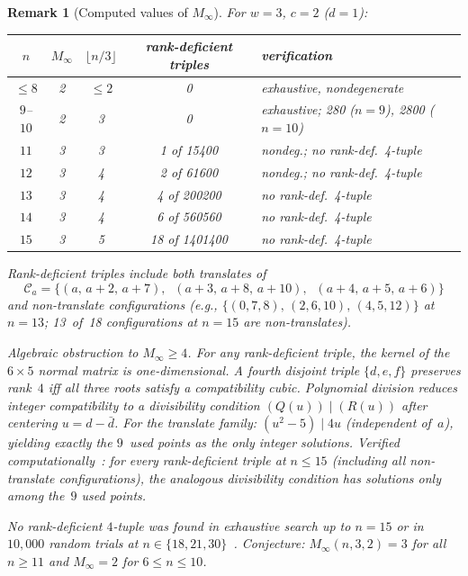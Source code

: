 \documentclass[11pt]{article}
\newtheorem{remark}[theorem]{Remark}
\begin{document}
\begin{remark}[Computed values of $M_\infty$]
\label{rem:M-infty-values}
For $w = 3$, $c = 2$ ($d = 1$):
\begin{center}\small
\begin{tabular}{ccccl}
\toprule
$n$ & $M_\infty$ & $\lfloor n/3 \rfloor$ & rank-deficient triples & verification \\
\midrule
$\leq 8$ & 2 & $\leq 2$ & 0 & exhaustive, nondegenerate \\
$9$--$10$ & 2 & 3 & 0 & exhaustive; 280 ($n{=}9$), 2800 ($n{=}10$) \\
$11$ & 3 & 3 & 1 of 15400 & nondeg.; no rank-def.\ 4-tuple \\
$12$ & 3 & 4 & 2 of 61600 & nondeg.; no rank-def.\ 4-tuple \\
$13$ & 3 & 4 & 4 of 200200 & no rank-def.\ 4-tuple \\
$14$ & 3 & 4 & 6 of 560560 & no rank-def.\ 4-tuple \\
$15$ & 3 & 5 & 18 of 1401400 & no rank-def.\ 4-tuple \\
\bottomrule
\end{tabular}
\end{center}
Rank-deficient triples include both \emph{translates} of
\begin{equation*}
\mathcal{C}_a = \bigl\{(a,\,a{+}2,\,a{+}7),\;\;(a{+}3,\,a{+}8,\,a{+}10),\;\;(a{+}4,\,a{+}5,\,a{+}6)\bigr\}
\end{equation*}
and \emph{non-translate} configurations (e.g., $\{(0,7,8),\,(2,6,10),\,(4,5,12)\}$ at $n = 13$; 13~of~18 configurations at $n = 15$ are non-translates).

\smallskip\noindent\emph{Algebraic obstruction to $M_\infty \geq 4$.}
For any rank-deficient triple, the kernel of the $6 \times 5$ normal matrix is one-dimensional.
A fourth disjoint triple $\{d, e, f\}$ preserves rank~$4$ iff all three roots satisfy a compatibility cubic.
Polynomial division reduces integer compatibility to a divisibility condition $(Q(u)) \mid (R(u))$ after centering $u = d - \bar{d}$.
For the translate family: $(u^2 - 5) \mid 4u$ (independent of~$a$), yielding exactly the $9$~used points as the only integer solutions.
Verified computationally~\cite{CompanionRepo}: for every rank-deficient triple at $n \leq 15$ (including all non-translate configurations), the analogous divisibility condition has solutions only among the~$9$ used points.

No rank-deficient $4$-tuple was found in exhaustive search up to $n = 15$ or in $10{,}000$ random trials at $n \in \{18, 21, 30\}$~\cite{CompanionRepo}.
Conjecture: $M_\infty(n, 3, 2) = 3$ for all $n \geq 11$ and $M_\infty = 2$ for $6 \leq n \leq 10$.
\end{remark}
\end{document}
